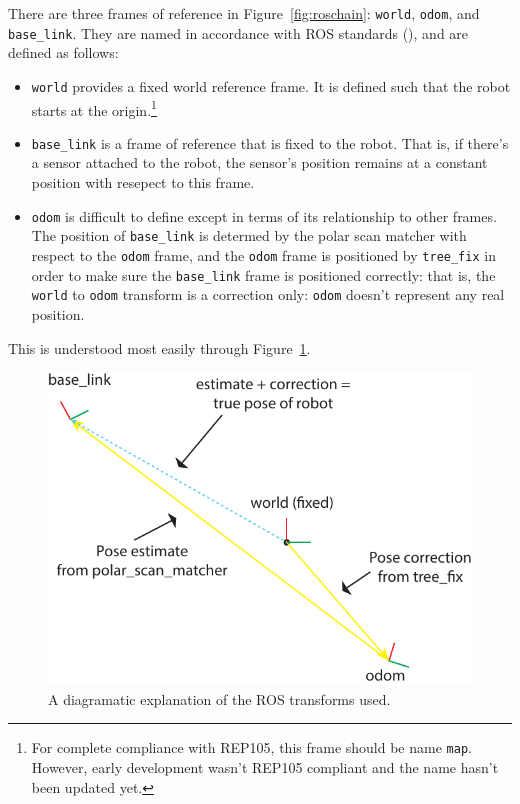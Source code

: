 \documentclass[12pt,oneside,a4paper]{book}
\begin{document}
There are three frames of reference in Figure~\ref{fig:roschain}:
\texttt{world}, \texttt{odom}, and \texttt{base\_link}. They are named
in accordance with ROS standards (), and are
defined as follows:
\begin{itemize}
\item \texttt{world} provides a fixed world reference frame. It is
  defined such that the robot starts at the origin.\footnote{For
    complete compliance with REP105, this frame should be name
    \texttt{map}. However, early development wasn't REP105 compliant
    and the name hasn't been updated yet.}
\item \texttt{base\_link} is a frame of reference that is fixed to the
  robot. That is, if there's a sensor attached to the robot, the
  sensor's position remains at a constant position with resepect to
  this frame.
\item \texttt{odom} is difficult to define except in terms of its
  relationship to other frames. The position of \texttt{base\_link} is
  determed by the polar scan matcher with respect to the \texttt{odom}
  frame, and the \texttt{odom} frame is positioned by
  \texttt{tree\_fix} in order to make sure the \texttt{base\_link} frame
  is positioned correctly: that is, the \texttt{world} to
  \texttt{odom} transform is a correction only: \texttt{odom} doesn't
  represent any real position.
\end{itemize}

This is understood most easily through Figure~\ref{fig:rostf}.

\begin{figure}[h!]
  \centering
  \includegraphics[width=\textwidth]{figs/rostf}
  \caption{A diagramatic explanation of the ROS transforms used.}
  \label{fig:rostf}
\end{figure}
\end{document}
